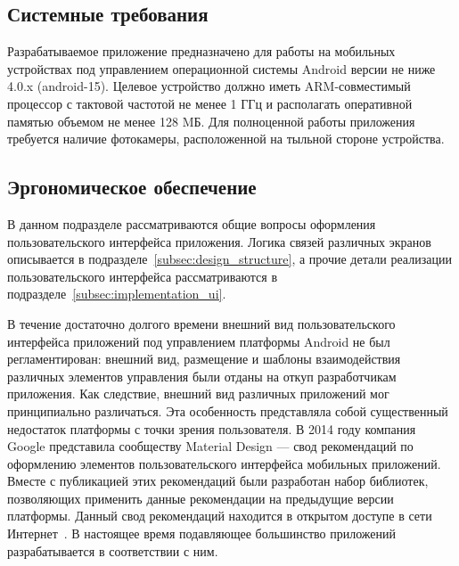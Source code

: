 


\subsection{Системные требования}

Разрабатываемое приложение предназначено для работы на мобильных устройствах
под управлением операционной системы Android версии не ниже 4.0.x (android-15).
Целевое устройство должно иметь ARM-совместимый процессор с тактовой частотой не менее
1 ГГц и располагать оперативной памятью объемом не менее 128 MБ.
Для полноценной работы приложения требуется наличие фотокамеры,
расположенной на тыльной стороне устройства.

\subsection{Эргономическое обеспечение}

В данном подразделе рассматриваются общие вопросы оформления
пользовательского интерфейса приложения.
Логика связей различных экранов описывается в подразделе~\ref{subsec:design_structure},
а прочие детали реализации пользовательского интерфейса рассматриваются в
подразделе~\ref{subsec:implementation_ui}.

В течение достаточно долгого времени внешний вид пользовательского интерфейса
приложений под управлением платформы Android не был регламентирован:
внешний вид, размещение и шаблоны взаимодействия различных элементов управления
были отданы на откуп разработчикам приложения.
Как следствие, внешний вид различных приложений мог принципиально различаться.
Эта особенность представляла собой существенный недостаток платформы
с точки зрения пользователя.
В 2014 году компания Google представила сообществу Material Design ---
свод рекомендаций по оформлению элементов пользовательского интерфейса
мобильных приложений. Вместе с публикацией этих рекомендаций были
разработан набор библиотек, позволяющих применить данные рекомендации
на предыдущие версии платформы.
Данный свод рекомендаций находится в открытом доступе в сети
Интернет~\cite{material_design}.
В настоящее время подавляющее большинство приложений разрабатывается
в соответствии с ним.

